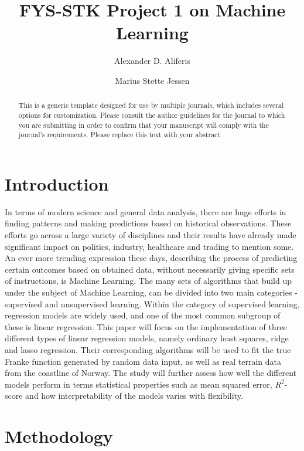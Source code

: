 \documentclass[...,numrefs]{wiley-article}
\title{FYS-STK Project 1 on Machine Learning}
\author{Alexander D. Aliferis}
\author{Marius Stette Jessen}
\affil{Department of Physics, University of Oslo, Norway}
\begin{document}
\maketitle

\begin{abstract}
This is a generic template designed for use by multiple journals, which includes several options for customization. Please consult the author guidelines for the journal to which you are submitting in order to confirm that your manuscript will comply with the journal's requirements. Please replace this text with your abstract.

\end{abstract}
\newline
\section{Introduction}
In terms of modern science and general data analysis, there are huge efforts in finding patterns and making predictions based on historical observations. These efforts go across a large variety of disciplines and their results have already made significant impact on politics, industry, healthcare and trading to mention some. An ever more trending expression these days, describing the process of predicting certain outcomes based on obtained data, without necessarily giving specific sets of instructions, is Machine Learning. The many sets of algorithms that build up under the subject of Machine Learning, can be divided into two main categories - supervised and unsupervised learning. Within the category of supervised learning, regression models are widely used, and one of the most common subgroup of these is linear regression. This paper will focus on the implementation of three different types of linear regression models, namely ordinary least squares, ridge and lasso regression. Their corresponding algorithms will be used to fit the true Franke function generated by random data input, as well as real terrain data from the coastline of Norway. The study will further assess how well the different models perform in terms statistical properties such as mean squared error, $R^2$-score and how interpretability of the models varies with flexibility. 

\vspace{22mm}

\section{Methodology}
\end{document}
